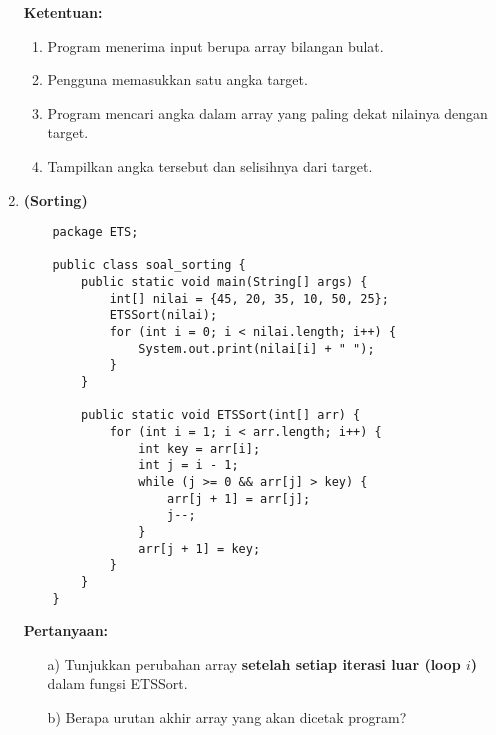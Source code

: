 \documentclass[12pt]{article}
\begin{document}
\begin{enumerate}
    \textbf{Ketentuan:}
    \begin{enumerate}
        \item Program menerima input berupa array bilangan bulat.
        \item Pengguna memasukkan satu angka target.
        \item Program mencari angka dalam array yang paling dekat nilainya dengan target.
        \item Tampilkan angka tersebut dan selisihnya dari target.
    \end{enumerate}

        \item \textbf{(Sorting)} \\
    \begin{tcolorbox}[title=Program Java - Sorting]
    \begin{verbatim}
    package ETS;

    public class soal_sorting {
        public static void main(String[] args) {
            int[] nilai = {45, 20, 35, 10, 50, 25};
            ETSSort(nilai);
            for (int i = 0; i < nilai.length; i++) {
                System.out.print(nilai[i] + " ");
            }
        }

        public static void ETSSort(int[] arr) {
            for (int i = 1; i < arr.length; i++) {
                int key = arr[i];
                int j = i - 1;
                while (j >= 0 && arr[j] > key) {
                    arr[j + 1] = arr[j];
                    j--;
                }
                arr[j + 1] = key;
            }
        }
    }
    \end{verbatim}
    \end{tcolorbox}

    \textbf{Pertanyaan:}
    \begin{enumerate}
        \item[a)] Tunjukkan perubahan array \textbf{setelah setiap iterasi luar (loop $i$)} dalam fungsi ETSSort.
        \item[b)] Berapa urutan akhir array yang akan dicetak program?
    \end{enumerate}


\end{enumerate}
\end{document}

